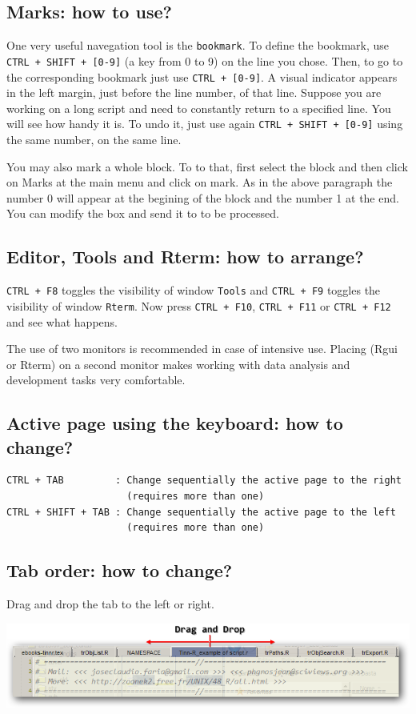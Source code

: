\subsection{Marks: how to use?}

One very useful navegation tool is the \texttt{bookmark}. To define the bookmark,
use \texttt{CTRL + SHIFT + [0-9]} (a key from 0 to 9) on the line you chose.
Then, to go to the corresponding bookmark just use \texttt{CTRL + [0-9]}.
A visual indicator appears in the left margin, just before the line number, of that line.
Suppose you are working on a long script and need to constantly return to a specified line.
You will see how handy it is. To undo it, just use again \texttt{CTRL + SHIFT + [0-9]} using the same number, on the same line.

You may also mark a whole block. To to that, first select the block and then click on Marks at the main menu and click on mark.
As in the above paragraph the number 0 will appear at the begining of the block and the number 1 at the end.
You can modify the box and send it to \RR{} to be processed.

\subsection{Editor, Tools and Rterm: how to arrange?}

\texttt{CTRL + F8} toggles the visibility of window \texttt{Tools} and \texttt{CTRL + F9}
toggles the visibility of window \texttt{Rterm}. Now press \texttt{CTRL + F10},
\texttt{CTRL + F11} or \texttt{CTRL + F12} and see what happens.

The use of two monitors is recommended in case of intensive use.
Placing \RR{} (Rgui or Rterm) on a second monitor makes working with data analysis and development tasks very comfortable.

\subsection{Active page using the keyboard: how to change?}

\begin{verbatim}
CTRL + TAB         : Change sequentially the active page to the right
                     (requires more than one)
CTRL + SHIFT + TAB : Change sequentially the active page to the left
                     (requires more than one)
\end{verbatim}

\subsection{Tab order: how to change?}

Drag and drop the tab to the left or right.

\includegraphics[scale=0.50]{./res/filetabs.png}
